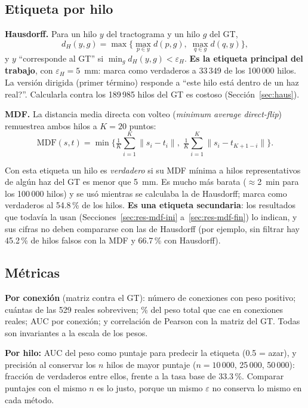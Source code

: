 \documentclass[11pt,a4paper]{article}
\newcommand{\eps}{\varepsilon}
\begin{document}
\subsection{Etiqueta por hilo}

\textbf{Hausdorff.} Para un hilo $y$ del tractograma y un hilo $g$ del GT,
\begin{equation}
  d_H(y,g)=\max\Big\{\max_{p\in y} d(p,g),\; \max_{q\in g} d(q,y)\Big\},
\end{equation}
y $y$ ``corresponde al GT'' si $\min_g d_H(y,g)<\eps_H$. \textbf{Es la etiqueta principal
del trabajo}, con $\eps_H=5$~mm: marca como verdaderos a 33\,349 de los 100\,000 hilos. La versi\'on dirigida
(primer t\'ermino) responde a ``\textquestiondown este hilo est\'a dentro de un haz real?''.
Calcularla contra los 189\,985 hilos del GT es costoso (Secci\'on~\ref{sec:haus}).

\textbf{MDF.} La distancia media directa con volteo (\textit{minimum average direct-flip})
\cite{garyfallidis2012} remuestrea ambos hilos a $K=20$ puntos:
\begin{equation}
  \mathrm{MDF}(s,t)=\min\Big\{\tfrac1K\sum_{i=1}^{K}\lVert s_i-t_i\rVert,\;
                       \tfrac1K\sum_{i=1}^{K}\lVert s_i-t_{K+1-i}\rVert\Big\}.
\end{equation}

Con esta etiqueta un hilo es \textit{verdadero} si su MDF m\'inima a hilos representativos de alg\'un haz del GT es menor que 5~mm. Es mucho m\'as barata ($\approx$2~min para los 100\,000 hilos) y se us\'o mientras se calculaba la de Hausdorff; marca como verdaderos al 54.8\,\% de los hilos. \textbf{Es una etiqueta secundaria}: los resultados que todav\'ia la usan (Secciones~\ref{sec:res-mdf-ini} a~\ref{sec:res-mdf-fin}) lo indican, y sus cifras no deben compararse con las de Hausdorff (por ejemplo, sin filtrar hay 45.2\,\% de hilos falsos con la MDF y 66.7\,\% con Hausdorff).

\subsection{M\'etricas}

\textbf{Por conexi\'on} (matriz contra el GT): n\'umero de conexiones con peso positivo;
cu\'antas de las 529 reales sobreviven; \% del peso total que cae en conexiones reales;
AUC por conexi\'on; y correlaci\'on de Pearson con la matriz del GT. Todas son invariantes
a la escala de los pesos.

\textbf{Por hilo:} AUC del peso como puntaje para predecir la etiqueta (0.5 = azar), y
precisi\'on al conservar los $n$ hilos de mayor puntaje ($n=10\,000$, 25\,000, 50\,000):
fracci\'on de verdaderos entre ellos, frente a la tasa base de 33.3\,\%. Comparar puntajes con
el mismo $n$ es lo justo, porque un mismo $\eps$ no conserva lo mismo en cada m\'etodo.
\end{document}
